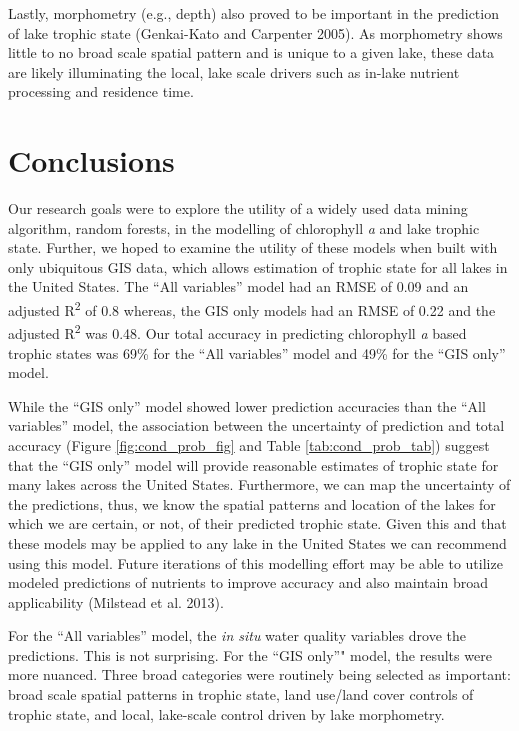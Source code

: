 \documentclass[12pt,]{article}
\begin{document}
Lastly, morphometry (e.g., depth) also proved to be important in the
prediction of lake trophic state (Genkai-Kato and Carpenter 2005). As
morphometry shows little to no broad scale spatial pattern and is unique
to a given lake, these data are likely illuminating the local, lake
scale drivers such as in-lake nutrient processing and residence time.

\section{Conclusions}\label{conclusions}

Our research goals were to explore the utility of a widely used data
mining algorithm, random forests, in the modelling of chlorophyll
\emph{a} and lake trophic state. Further, we hoped to examine the
utility of these models when built with only ubiquitous GIS data, which
allows estimation of trophic state for all lakes in the United States.
The ``All variables'' model had an RMSE of 0.09 and an adjusted
R\textsuperscript{2} of 0.8 whereas, the GIS only models had an RMSE of
0.22 and the adjusted R\textsuperscript{2} was 0.48. Our total accuracy
in predicting chlorophyll \emph{a} based trophic states was 69\% for the
``All variables'' model and 49\% for the ``GIS only'' model.

While the ``GIS only'' model showed lower prediction accuracies than the
``All variables'' model, the association between the uncertainty of
prediction and total accuracy (Figure \ref{fig:cond_prob_fig} and Table
\ref{tab:cond_prob_tab}) suggest that the ``GIS only'' model will
provide reasonable estimates of trophic state for many lakes across the
United States. Furthermore, we can map the uncertainty of the
predictions, thus, we know the spatial patterns and location of the
lakes for which we are certain, or not, of their predicted trophic
state. Given this and that these models may be applied to any lake in
the United States we can recommend using this model. Future iterations
of this modelling effort may be able to utilize modeled predictions of
nutrients to improve accuracy and also maintain broad applicability
(Milstead et al. 2013).

For the ``All variables'' model, the \emph{in situ} water quality
variables drove the predictions. This is not surprising. For the ``GIS
only''" model, the results were more nuanced. Three broad categories
were routinely being selected as important: broad scale spatial patterns
in trophic state, land use/land cover controls of trophic state, and
local, lake-scale control driven by lake morphometry.
\end{document}
